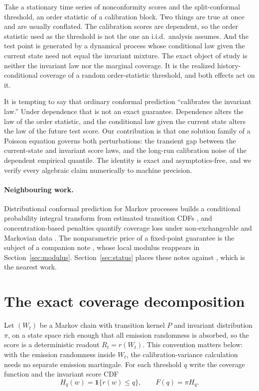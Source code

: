 \documentclass[11pt]{article}
\theoremstyle{definition}
\theoremstyle{remark}
\newcommand{\one}{\mathbf{1}}
\begin{document}
Take a stationary time series of nonconformity scores and the split-conformal threshold, an
order statistic of a calibration block. Two things are true at once and are usually
conflated. The calibration scores are dependent, so the order statistic used as the threshold
is not the one an i.i.d.\ analysis assumes. And the test point is generated by a dynamical
process whose conditional law given the current state need not equal the invariant mixture.
The exact object of study is neither the invariant law nor the marginal coverage. It is the
realized history-conditional coverage of a random order-statistic threshold, and both effects
act on it.

It is tempting to say that ordinary conformal prediction ``calibrates the invariant law.''
Under dependence that is not an exact guarantee. Dependence alters the law of the order
statistic, and the conditional law given the current state alters the law of the future test
score. Our contribution is that one solution family of a Poisson equation governs both
perturbations: the transient gap between the current-state and invariant score laws, and the
long-run calibration noise of the dependent empirical quantile. The identity is exact and
asymptotics-free, and we verify every algebraic claim numerically to machine precision.

\paragraph{Neighbouring work.} Distributional conformal prediction for Markov processes builds a
conditional probability integral transform from estimated transition CDFs \citep{dai2024markov}, and
concentration-based penalties quantify coverage loss under non-exchangeable and Markovian data
\citep{oliveira2024split,zheng2024markovian}. The nonparametric price of a fixed-point guarantee is
the subject of a companion note \citep{cotton2026honest}, whose local modulus reappears in
Section~\ref{sec:modulus}. Section~\ref{sec:status} places these notes against
\citet{ramos2024transported}, which is the nearest work.

\section{The exact coverage decomposition}\label{sec:decomp}

Let $(W_t)$ be a Markov chain with transition kernel $P$ and invariant distribution $\pi$,
on a state space rich enough that all emission randomness is absorbed, so the score is a
deterministic readout $R_t=r(W_t)$. This convention matters below: with the emission
randomness inside $W_t$, the calibration-variance calculation needs no separate emission
martingale. For each threshold $q$ write the coverage function and the invariant score CDF
\begin{equation}\label{eq:Hdef}
  H_q(w) = \one\{r(w)\le q\},
  \qquad
  F(q) = \pi H_q .
\end{equation}
\end{document}
